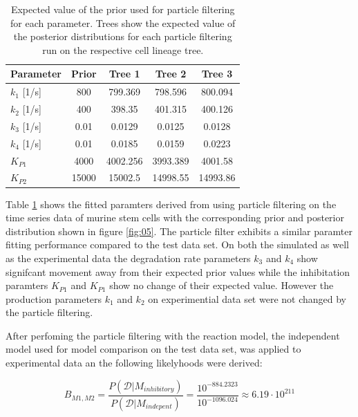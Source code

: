 \documentclass{bioinfo}
\begin{document}
\begin{table}[h]
\begin{center}
\begin{tabular}{l | c | c | c | c }
Parameter & Prior & Tree 1 & Tree 2 & Tree 3 \\
\hline
\texttt{$k_1$} [1/s]& 800 & 799.369 & 798.596 & 800.094\\
\texttt{$k_2$} [1/s]& 400 & 398.35 & 401.315 & 400.126\\
\texttt{$k_3$} [1/s]& 0.01 & 0.0129 & 0.0125 & 0.0128\\
\texttt{$k_4$} [1/s]& 0.01 &  0.0185 & 0.0159 & 0.0223\\
\texttt{$K_{P1}$} & 4000 & 4002.256 & 3993.389 & 4001.58\\
\texttt{$K_{P2}$} & 15000 & 15002.5 & 14998.55 & 14993.86\\
\end{tabular}

\vspace*{7pt}
\caption{Expected value of the prior used for particle filtering for each parameter. Trees show the expected value of the posterior distributions for each particle filtering run on the respective cell lineage tree.}
\label{tab:02}
\end{center}
\end{table}

Table \ref{tab:02} shows the fitted paramters derived from using particle filtering on the time series data of murine stem cells with the corresponding prior and posterior distribution shown in figure \ref{fig:05}. The particle filter exhibits a similar paramter fitting performance compared to the test data set. On both the simulated as well as the experimental data the degradation rate parameters $k_3$ and $k_4$ show signifcant movement away from their expected prior values while the inhibitation paramters $K_{P1}$ and $K_{P1}$ show no change of their expected value. However the production parameters $k_1$ and $k_2$ on experimential data set were not changed by the particle filtering.

After perfoming the particle filtering with the reaction model, the independent model used for model comparison on the test data set, was applied to experimental data an the following likelyhoods were derived:

\begin{equation}
B_{M1, M2} = \frac{P(\mathcal{D} | M_{inhibitory})}{P(\mathcal{D} | M_{indepent})} = \frac{10^{-884.2323}}{10^{-1096.024}} \approx 6.19 \cdot 10^{211} \label{eq:31}
\end{equation}
\end{document}
